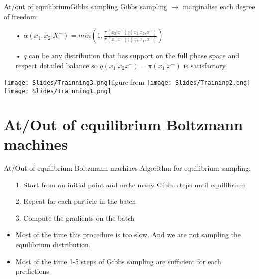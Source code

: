 \documentclass{beamer}
\begin{document}
\begin{frame}{At/out of equilibrium}{Gibbs sampling}
Gibbs sampling $\rightarrow$ marginalise each degree of freedom:
\begin{itemize}
    \item[•] $ \alpha( x_1,x_2 \vert X^{-} ) = min\left( 1, \frac{\pi(x_2 \vert x^{-}) q \left( x_1 \vert x_2, x^{-}\right)}{\pi(x_1 \vert x^{-}) q\left( x_2 \vert x_1, x^{-} \right)} \right) $
    \item[•] $q$ can be any distribution that has support on the full phase space and respect detailed balance so $q(x_1 \vert x_2 x^{-}) = \pi(x_1 \vert x^{-})$ is satisfactory.
\end{itemize}


\texttt{[image: Slides/Trainning3.png]}\hspace{3cm}figure from \cite{Mehta2019}
\texttt{[image: Slides/Training2.png]}
\texttt{[image: Slides/Trainning1.png]}

\end{frame}



\section{At/Out of equilibrium Boltzmann machines}
\begin{frame}{At/Out of equilibrium Boltzmann machines}
Algorithm for equilibrium sampling: 
\begin{itemize}
    \item[1.] Start from an initial point and make many Gibbs steps until equilibrium
    \item[2.] Repeat for each particle in the batch
    \item[3.] Compute the gradients on the batch
    \item Most of the time this procedure is too slow. And we are not sampling the equilibrium distribution.
    \item Most of the time 1-5 steps of Gibbs sampling are sufficient for each predictions
\end{itemize}

\end{frame}
\end{document}
